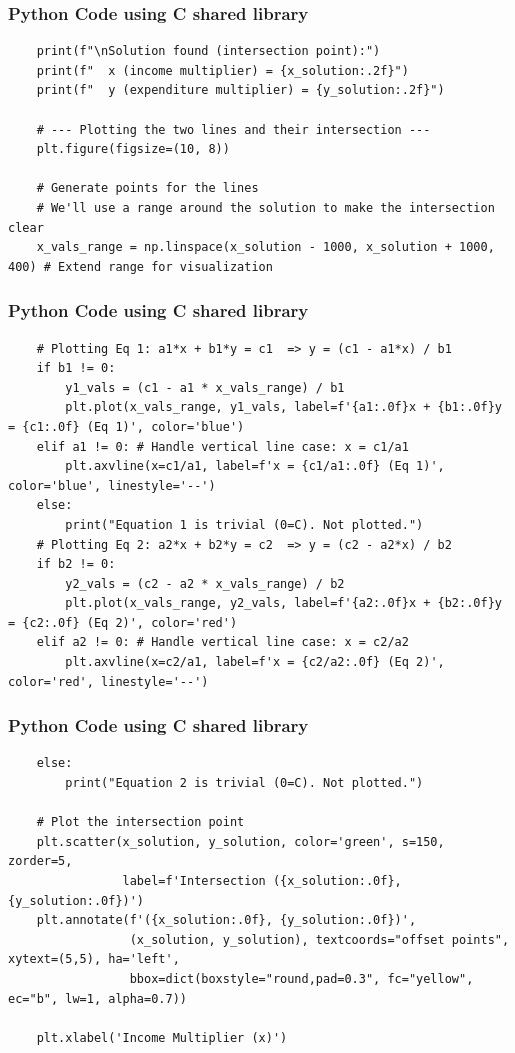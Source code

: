 \documentclass{beamer}
\begin{document}
\begin{frame}[fragile]
\frametitle{Python Code using C shared library}
\begin{lstlisting}
    print(f"\nSolution found (intersection point):")
    print(f"  x (income multiplier) = {x_solution:.2f}")
    print(f"  y (expenditure multiplier) = {y_solution:.2f}")

    # --- Plotting the two lines and their intersection ---
    plt.figure(figsize=(10, 8))

    # Generate points for the lines
    # We'll use a range around the solution to make the intersection clear
    x_vals_range = np.linspace(x_solution - 1000, x_solution + 1000, 400) # Extend range for visualization
\end{lstlisting}
\end{frame}

\begin{frame}[fragile]
\frametitle{Python Code using C shared library}
\begin{lstlisting}
    # Plotting Eq 1: a1*x + b1*y = c1  => y = (c1 - a1*x) / b1
    if b1 != 0:
        y1_vals = (c1 - a1 * x_vals_range) / b1
        plt.plot(x_vals_range, y1_vals, label=f'{a1:.0f}x + {b1:.0f}y = {c1:.0f} (Eq 1)', color='blue')
    elif a1 != 0: # Handle vertical line case: x = c1/a1
        plt.axvline(x=c1/a1, label=f'x = {c1/a1:.0f} (Eq 1)', color='blue', linestyle='--')
    else:
        print("Equation 1 is trivial (0=C). Not plotted.")
    # Plotting Eq 2: a2*x + b2*y = c2  => y = (c2 - a2*x) / b2
    if b2 != 0:
        y2_vals = (c2 - a2 * x_vals_range) / b2
        plt.plot(x_vals_range, y2_vals, label=f'{a2:.0f}x + {b2:.0f}y = {c2:.0f} (Eq 2)', color='red')
    elif a2 != 0: # Handle vertical line case: x = c2/a2
        plt.axvline(x=c2/a1, label=f'x = {c2/a2:.0f} (Eq 2)', color='red', linestyle='--')
        \end{lstlisting}
\end{frame}

\begin{frame}[fragile]
\frametitle{Python Code using C shared library}
\begin{lstlisting}
    else:
        print("Equation 2 is trivial (0=C). Not plotted.")

    # Plot the intersection point
    plt.scatter(x_solution, y_solution, color='green', s=150, zorder=5,
                label=f'Intersection ({x_solution:.0f}, {y_solution:.0f})')
    plt.annotate(f'({x_solution:.0f}, {y_solution:.0f})',
                 (x_solution, y_solution), textcoords="offset points", xytext=(5,5), ha='left',
                 bbox=dict(boxstyle="round,pad=0.3", fc="yellow", ec="b", lw=1, alpha=0.7))

    plt.xlabel('Income Multiplier (x)')
    \end{lstlisting}
\end{frame}
\end{document}
